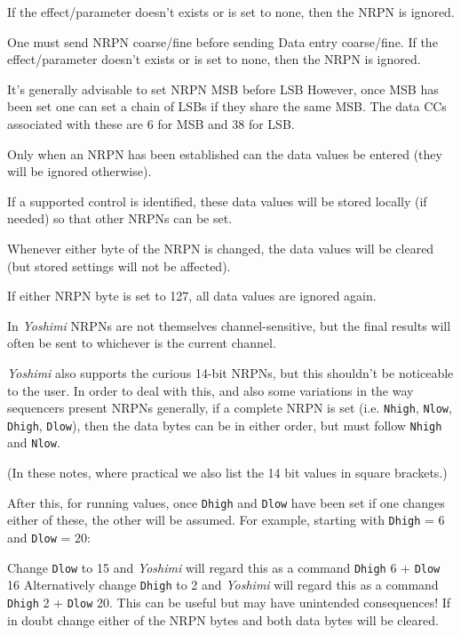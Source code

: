    If the effect/parameter doesn't exists or is set to none, then the NRPN is
   ignored.

   One must send NRPN coarse/fine before sending Data entry coarse/fine.  If
   the effect/parameter doesn't exists or is set to none, then the NRPN is
   ignored.

   It's generally advisable to set NRPN MSB before LSB However, once MSB has
   been set one can set a chain of LSBs if they share the same MSB.
   The data CCs associated with these are 6 for MSB and 38 for LSB.

   Only when an NRPN has been established can the data values be entered
   (they will be ignored otherwise).

   If a supported control is identified, these data values will be stored
   locally (if needed) so that other NRPNs can be set.

   Whenever either byte of the NRPN is changed, the data values will be
   cleared (but stored settings will not be affected).

   If either NRPN byte is set to 127, all data values are ignored again.

   In \textsl{Yoshimi} NRPNs are not themselves channel-sensitive, but the
   final results will often be sent to whichever is the current channel.

   \textsl{Yoshimi} also supports the curious 14-bit NRPNs, but this shouldn't
   be noticeable to the user. In order to deal with this, and also some
   variations in the way sequencers present NRPNs generally, if a complete
   NRPN is set
   (i.e. \texttt{Nhigh}, \texttt{Nlow}, \texttt{Dhigh}, \texttt{Dlow}),
   then the data bytes can be in
   either order, but must follow \texttt{Nhigh} and \texttt{Nlow}.

   (In these notes, where practical we also list the 14 bit values in square
   brackets.)

   After this, for running values, once
   \texttt{Dhigh} and \texttt{Dlow} have been set if one
   changes either of these, the other will be assumed.
   For example, starting with \texttt{Dhigh} = 6 and \texttt{Dlow} = 20:

   Change \texttt{Dlow} to 15 and \textsl{Yoshimi} will regard this as a
   command \texttt{Dhigh} 6 + \texttt{Dlow} 16 Alternatively change
   \texttt{Dhigh} to 2 and \textsl{Yoshimi} will regard this as a
   command \texttt{Dhigh} 2 + \texttt{Dlow} 20.
   This can be useful but may have unintended consequences!
   If in doubt change either of the NRPN bytes and both data bytes will be
   cleared.


